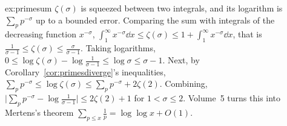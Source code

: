 \begin{solution}{ex:primesum}
\idea $\zeta(\sigma)$ is squeezed between two integrals, and its logarithm is $\sum_pp^{-\sigma}$ up to a bounded error.
\writeup Comparing the sum with integrals of the decreasing function $x^{-\sigma}$, $\int_1^\infty x^{-\sigma}\dd x\le\zeta(\sigma)\le1+\int_1^\infty x^{-\sigma}\dd x$, that is
$\frac1{\sigma-1}\le\zeta(\sigma)\le\frac\sigma{\sigma-1}$. Taking logarithms, $0\le\log\zeta(\sigma)-\log\frac1{\sigma-1}\le\log\sigma\le\sigma-1$. Next, by Corollary~\ref{cor:primesdiverge}'s inequalities,
$\sum_pp^{-\sigma}\le\log\zeta(\sigma)\le\sum_pp^{-\sigma}+2\zeta(2)$. Combining, $\bigl|\sum_pp^{-\sigma}-\log\frac1{\sigma-1}\bigr|\le2\zeta(2)+1$ for $1<\sigma\le2$. Volume~5 turns this into Mertens's
theorem $\sum_{p\le x}\frac1p=\log\log x+O(1)$.
\end{solution}

